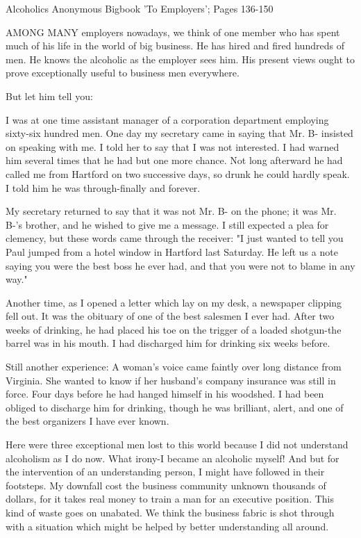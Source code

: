 
Alcoholics Anonymous Bigbook 'To Employers'; Pages 136-150

\begin{biblechapter}

AMONG MANY employers nowadays, we think of one member who has spent much of his life in the world of big business.  He has hired and fired hundreds of men.  He knows the alcoholic as the employer sees him.  His present views ought to prove exceptionally useful to business men everywhere. 

But let him tell you:

I was at one time assistant manager of a corporation department employing sixty-six hundred men.  One day my secretary came in saying that Mr. B- insisted on speaking with me.  I told her to say that I was not interested.  I had warned him several times that he had but one more chance.  Not long afterward he had called me from Hartford on two successive days, so drunk he could hardly speak.  I told him he was through-finally and forever.

My secretary returned to say that it was not Mr. B- on the phone; it was Mr. B-'s brother, and he wished to give me a message.  I still expected a plea for clemency, but these words came through the receiver:  "I just wanted to tell you Paul jumped from a hotel window in Hartford last Saturday.  He left us a note saying you were the best boss he ever had, and that you were not to blame in any way."

Another time, as I opened a letter which lay on my desk, a newspaper clipping fell out.  It was the obituary of one of the best salesmen I ever had.  After two weeks of drinking, he had placed his toe on the trigger of a loaded shotgun-the barrel was in his mouth.  I had discharged him for drinking six weeks before.

Still another experience:  A woman's voice came faintly over long distance from Virginia.  She wanted to know if her husband's company insurance was still in force.  Four days before he had hanged himself in his woodshed.  I had been obliged to discharge him for drinking, though he was brilliant, alert, and one of the best organizers I have ever known.

Here were three exceptional men lost to this world because I did not understand alcoholism as I do now.  What irony-I became an alcoholic myself!  And but for the intervention of an understanding person, I might have followed in their footsteps.  My downfall cost the business community unknown thousands of dollars, for it takes real money to train a man for an executive position.  This kind of waste goes on unabated.  We think the business fabric is shot through with a situation which might be helped by better understanding all around. 


\end{biblechapter}
